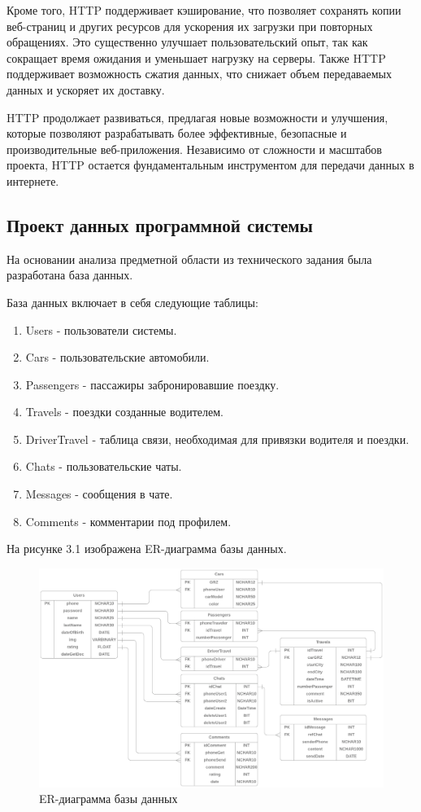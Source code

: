 Кроме того, HTTP поддерживает кэширование, что позволяет сохранять копии веб-страниц и других ресурсов для ускорения их загрузки при повторных обращениях. Это существенно улучшает пользовательский опыт, так как сокращает время ожидания и уменьшает нагрузку на серверы. Также HTTP поддерживает возможность сжатия данных, что снижает объем передаваемых данных и ускоряет их доставку.

HTTP продолжает развиваться, предлагая новые возможности и улучшения, которые позволяют разрабатывать более эффективные, безопасные и производительные веб-приложения. Независимо от сложности и масштабов проекта, HTTP остается фундаментальным инструментом для передачи данных в интернете.

\subsection{Проект данных программной системы}

На основании анализа предметной области из технического задания была разработана база данных.

База данных включает в себя следующие таблицы:

\begin{enumerate}
	\item Users - пользователи системы.
	\item Cars - пользовательские автомобили.
	\item Passengers - пассажиры забронировавшие поездку.
	\item Travels - поездки созданные водителем.
	\item DriverTravel - таблица связи, необходимая для привязки водителя и поездки.
	\item Chats - пользовательские чаты.
	\item Messages - сообщения в чате.
	\item Comments - комментарии под профилем.
\end{enumerate}

На рисунке 3.1 изображена ER-диаграмма базы данных.

\begin{figure}[H]
	\centering
	\includegraphics[width=0.9\linewidth]{images/ErDiagramDB}
	\caption{ER-диаграмма базы данных}
	\label{fig:erdiagramdb}
\end{figure}

